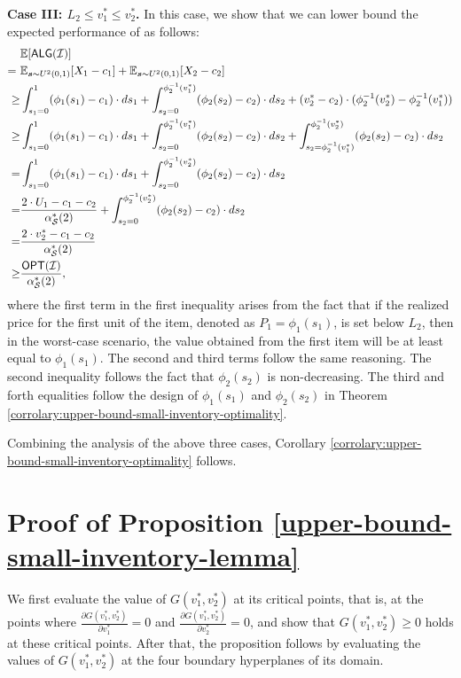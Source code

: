 \textbf{\textbf{Case III}: $L_2 \leq v^{*}_1 \leq v^{*}_2$.} In this case, we show that we can lower bound the expected performance of \rDynamic as follows:
    \begin{align*}
         & \mathbb{E}[\textsf{ALG}(\mathcal{I})] \\
         =\ & \mathbb{E}_{\boldsymbol{s} \sim U^{2}(0,1)}[X_{1} - c_{1}] + \mathbb{E}_{\boldsymbol{s} \sim U^{2}(0,1)}[X_{2} - c_{2}] \\
         \ge & \int_{s_{1}=0}^{1} (\phi_{1}(s_{1})-c_1)\cdot ds_{1} + \int_{s_{2}=0}^{\phi_{2}^{-1}(v^{*}_{1})} (\phi_{2}(s_{2})-c_2)\cdot ds_{2}   + (v^{*}_{2}-c_{2}) \cdot (\phi^{-1}_{2}(v^{*}_{2})-\phi^{-1}_{2}(v^{*}_{1})) \\
         \ge & \int_{s_{1}=0}^{1} (\phi_{1}(s_{1})-c_1)\cdot ds_{1} + \int_{s_{2}=0}^{\phi_{2}^{-1}(v^{*}_{1})} (\phi_{2}(s_{2})-c_2)\cdot ds_{2} + \int_{s_{2}=\phi_{2}^{-1}(v^{*}_{1})}^{\phi_{2}^{-1}(v^{*}_{2})} (\phi_{2}(s_{2})-c_2)\cdot ds_{2} \\
         = & \int_{s_{1}=0}^{1} (\phi_{1}(s_{1})-c_1)\cdot ds_{1} + \int_{s_{2}=0}^{\phi_{2}^{-1}(v^{*}_{2})} (\phi_{2}(s_{2})-c_2)\cdot ds_{2}  \\
         = & \frac{2\cdot U_{1}-c_1-c_2}{\alpha_{\mathcal{S}}^*(2)} + \int_{s_{2}=0}^{\phi_{2}^{-1}(v^{*}_{2})} (\phi_{2}(s_{2})-c_2)\cdot ds_{2} \\
         = & \frac{2 \cdot v^{*}_{2}-c_1-c_2}{\alpha_{\mathcal{S}}^*(2)} \\
        \ge &  \frac{\textsf{OPT}(\mathcal{I})}{\alpha_{\mathcal{S}}^*(2)},
    \end{align*}
where the first term in the first inequality arises from the fact that if the realized price for the first unit of the item, denoted as $P_{1} = \phi_{1}(s_1)$, is set below $L_{2}$, then in the worst-case scenario, the value obtained from the first item will be at least equal to $\phi_{1}(s_1)$. The second and third terms follow the same reasoning. The second inequality follows the fact that $\phi_{2}(s_2)$ is non-decreasing. The third and forth equalities follow the design of  
 $\phi_1(s_1)$ and $\phi_2(s_2)$ in Theorem \ref{corrolary:upper-bound-small-inventory-optimality}. 
 
 Combining the analysis of the above three cases, Corollary \ref{corrolary:upper-bound-small-inventory-optimality} follows. 


\section{Proof of Proposition \ref{upper-bound-small-inventory-lemma}}
\label{appendix:upper-bound-small-inventory-lemma}
We first evaluate the value of $G(v^{*}_{1}, v^{*}_{2})$ at its critical points, that is, at the points where $\frac{\partial G(v^{*}_{1}, v^{*}_{2})}{\partial v^{*}_{1}} = 0$ and $\frac{\partial G(v^{*}_{1}, v^{*}_{2})}{\partial v^{*}_{2}} = 0$, and show that $G(v^{*}_{1}, v^{*}_{2}) \geq 0$ holds at these critical points. After that, the proposition follows by evaluating the values of $G(v^{*}_{1}, v^{*}_{2})$ at the four boundary hyperplanes of its domain.


